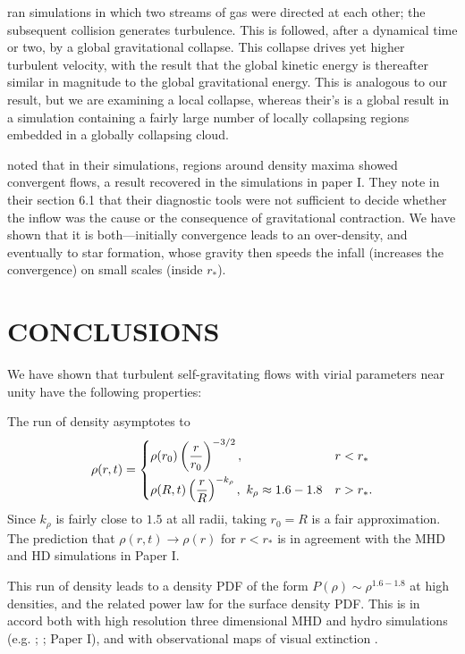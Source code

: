 \documentclass[iop,apj,numberedappendix]{emulateapj}
\newcommand       \phil[1]      {{\color{blue} #1}}
\newcommand       \be		{\begin{equation}}
\newcommand       \ee		{\end{equation}}
\begin{document}
\citet{2007ApJ...657..870V} ran simulations in which two streams of
gas were directed at each other; the subsequent collision generates
turbulence. This is followed, after a dynamical time or two, by a
global gravitational collapse. This collapse drives yet higher
turbulent velocity, with the result that the global kinetic energy is
thereafter similar in magnitude to the global gravitational
energy. This is analogous to our result, but we are examining a local
collapse, whereas their's is a global result in a simulation
containing a fairly large number of locally collapsing regions
embedded in a globally collapsing cloud.

\citet{2008MNRAS.390..769V} noted that in their simulations, regions
around density maxima showed convergent flows, a result recovered in
the simulations in paper I. They note in their section 6.1 that their
diagnostic tools were not sufficient to decide whether the inflow was
the cause or the consequence of gravitational contraction. We have
shown that it is both---initially convergence leads to an
over-density, and eventually to star formation, whose gravity then
speeds the infall (increases the convergence) on small scales (inside
$r_*$).

\section{CONCLUSIONS}
\label{sec:concl}
We have shown that turbulent self-gravitating flows with virial
parameters near unity have the following properties:

The run of density asymptotes to 
\be
\rho(r,t)=
\begin{dcases}
\rho(r_0)\left({r\over r_0}\right)^{-3/2}, & r<r_*\\
\rho(R,t)\left({r\over R}\right)^{-k_\rho}, \ k_\rho\approx1.6-1.8 & r>r_*.
\end{dcases}
\ee
Since $k_\rho$ is fairly close to $1.5$ at all radii, taking $r_0=R$
is a fair approximation. The prediction that
$\rho(r,t)\to\rho(r)$ for $r<r_*$ is in agreement with the MHD and
HD simulations in Paper I.

This run of density leads to a density PDF of the form $P(\rho)\sim
\rho^{1.6-1.8}$ at high densities, and the related power law for the
surface density PDF. This is in accord both with high resolution three
dimensional MHD and hydro simulations (e.g. \citealt{2011ApJ...727L..20K}; \citealt{2012ApJ...750...13C}; \phil{Paper I}), and with
observational maps of visual extinction \phil{\citep[e.g.][]{2009ApJ...703...52L,2009A&A...508L..35K}}.
\end{document}
